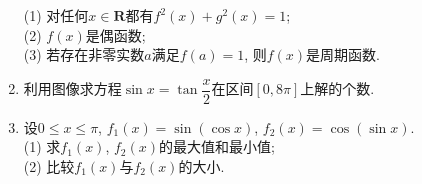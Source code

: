 \documentclass[10pt,a4paper]{article}
\begin{document}
\begin{enumerate}[1.]
(1) 对任何$x\in \mathbf{R}$都有$f^2(x)+g^2(x)=1$;\\
(2) $f(x)$是偶函数;\\
(3) 若存在非零实数$a$满足$f(a)=1$, 则$f(x)$是周期函数.
\item 利用图像求方程$\sin x=\tan \dfrac x2$在区间$[0,8\pi]$上解的个数.
\item 设$0\le x\le \pi$, $f_1(x)=\sin (\cos x)$, $f_2(x)=\cos (\sin x)$.\\
(1) 求$f_1(x)$, $f_2(x)$的最大值和最小值;\\
(2) 比较$f_1(x)$与$f_2(x)$的大小.
    
\end{enumerate}
\end{document}
